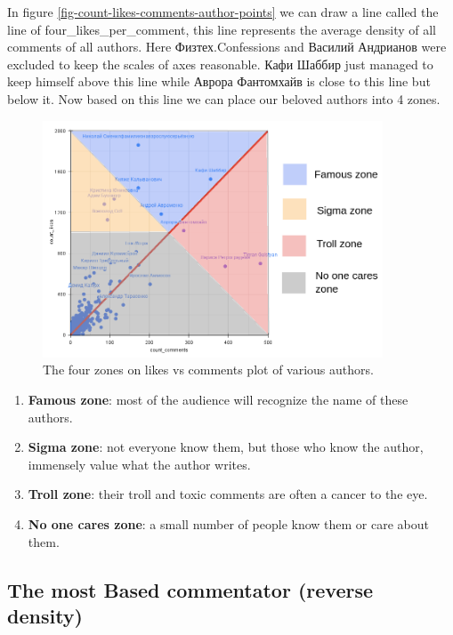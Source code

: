 \documentclass[
	12pt
] {article}
\begin{document}
	In figure \ref{fig-count-likes-comments-author-points} we can draw a line called the line of four\_likes\_per\_comment, this line represents the average density of all comments of all authors. Here Физтех.Confessions and Василий Андрианов were excluded to keep the scales of axes reasonable. Кафи Шаббир just managed to keep himself above this line while Аврора Фантомхайв is close to this line but below it. Now based on this line we can place our beloved authors into 4 zones.

	\begin{figure}[H]
		\centering
		\includegraphics[width=0.9\textwidth]{fig-likes-vs-comments-divided-into-zones}
		\caption{The four zones on likes vs comments plot of various authors.}
		\label{fig-likes-vs-comments-divided-into-zones}
	\end{figure}

	\begin{enumerate}
		\item \textbf{Famous zone}: most of the audience will recognize the name of these authors.
		\item \textbf{Sigma zone}: not everyone know them, but those who know the author, immensely value what the author writes.
		\item \textbf{Troll zone}: their troll and toxic comments are often a cancer to the eye.
		\item \textbf{No one cares zone}: a small number of people know them or care about them.
	\end{enumerate}

\subsection{The most Based commentator (reverse density)}
\end{document}
